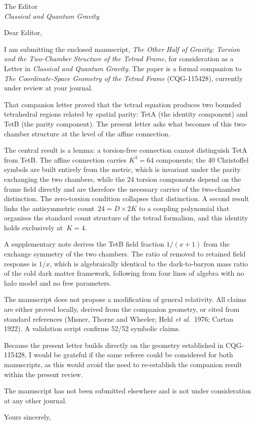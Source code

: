 \documentclass[11pt]{letter}
\begin{document}
\begin{letter}{%
The Editor\\
\textit{Classical and Quantum Gravity}%
}

\opening{Dear Editor,}

I am submitting the enclosed manuscript, \textit{The Other Half of
Gravity: Torsion and the Two-Chamber Structure of the Tetrad Frame},
for consideration as a Letter in \textit{Classical and Quantum Gravity}.
The paper is a formal companion to \textit{The Coordinate-Space Geometry
of the Tetrad Frame} (CQG-115428), currently under review at your journal.

That companion letter proved that the tetrad equation produces two
bounded tetrahedral regions related by spatial parity: TetA (the
identity component) and TetB (the parity component). The present letter
asks what becomes of this two-chamber structure at the level of the
affine connection.

The central result is a lemma: a torsion-free connection cannot
distinguish TetA from TetB. The affine connection carries $K^3 = 64$
components; the 40 Christoffel symbols are built entirely from the
metric, which is invariant under the parity exchanging the two chambers,
while the 24 torsion components depend on the frame field directly and
are therefore the necessary carrier of the two-chamber distinction. The
zero-torsion condition collapses that distinction. A second result links
the antisymmetric count~$24 = D \times 2K$ to a coupling polynomial
that organises the standard count structure of the tetrad formalism,
and this identity holds exclusively at~$K = 4$.

A supplementary note derives the TetB field fraction $1/(x{+}1)$
from the exchange symmetry of the two chambers. The ratio of removed
to retained field response is $1/x$, which is algebraically identical
to the dark-to-baryon mass ratio of the cold dark matter framework,
following from four lines of algebra with no halo model and no free
parameters.

The manuscript does not propose a modification of general relativity.
All claims are either proved locally, derived from the companion
geometry, or cited from standard references (Misner, Thorne and Wheeler;
Hehl \textit{et al.}\ 1976; Cartan 1922). A validation script confirms
52/52 symbolic claims.

Because the present letter builds directly on the geometry established
in CQG-115428, I would be grateful if the same referee could be
considered for both manuscripts, as this would avoid the need to
re-establish the companion result within the present review.

The manuscript has not been submitted elsewhere and is not under
consideration at any other journal.

\closing{Yours sincerely,}

\end{letter}
\end{document}
